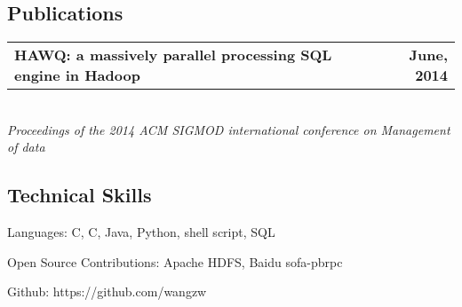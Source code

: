 \documentclass[10pt,letterpaper]{article}
\makeatletter
\newenvironment{indentsection}[1]%
{\begin{list}{}%
	{\setlength{\leftmargin}{#1}}%
	\item[]%
}
{\end{list}}
\newcommand{\headerrow}[2]
{\begin{tabular*}{\linewidth}{l@{\extracolsep{\fill}}r}
	#1 &
	#2 \\
\end{tabular*}}
\newcommand{\CPP}
{C\nolinebreak[4]\hspace{-.05em}\raisebox{.22ex}{\footnotesize\bf ++}}
\makeatother
\begin{document}
\begin{CJK}{UTF8}{gbsn}
\begin{itemize*}
\end{itemize*}

\vspace{-8mm}
\subsection*{Publications}
\vspace{-2mm}

\begin{itemize*}
	\parskip=0.2mm

	\item 
	\headerrow
		{\textbf{HAWQ: a massively parallel processing SQL engine in Hadoop}}
		{\textbf{June, 2014}}
	\\
	{\emph{Proceedings of the 2014 ACM SIGMOD international conference on Management of data}}

\end{itemize*}

\vspace{-8mm}
\subsection*{Technical Skills}
\vspace{-2mm}

\begin{indentsection}{\parindent}
\begin{description*}
	\item[Languages:]
	C, \CPP, Java, Python, shell script, SQL
	\item[Open Source Contributions:]
	Apache HDFS, Baidu sofa-pbrpc
	\item[Github:]
	https://github.com/wangzw
\end{description*}
\end{indentsection}

\end{CJK}
\end{document}
